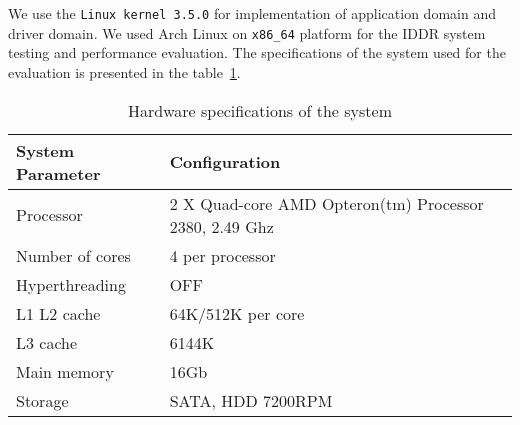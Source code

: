 We use the \texttt{Linux kernel 3.5.0} for implementation of application domain and driver domain. We used Arch Linux on \texttt{x86\_64} platform for the IDDR system testing and performance evaluation. The specifications of the system used for the evaluation is presented in the table~\ref{tab:config}. 

\begin{table}
\caption{Hardware specifications of the system}
\begin{center}
\begin{tabular}{ll}
  \hline
  \label{tab:config}
  System Parameter & Configuration \\
  \hline
  Processor & 2 X Quad-core AMD Opteron(tm) Processor 2380, 2.49 Ghz \\
  Number of cores & 4 per processor \\
  Hyperthreading & OFF \\
  L1 L2 cache & 64K/512K per core \\
  L3 cache & 6144K \\
  Main memory & 16Gb \\
  Storage & SATA, HDD 7200RPM \\
  \hline 
\end{tabular}
\end{center}
\end{table}

